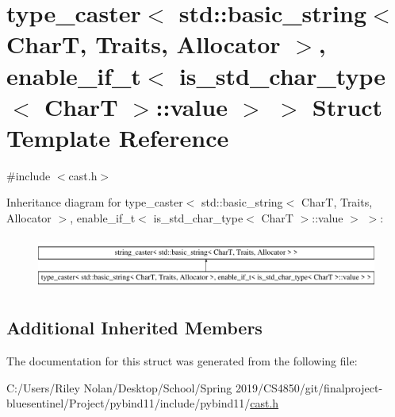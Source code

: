\hypertarget{structtype__caster_3_01std_1_1basic__string_3_01_char_t_00_01_traits_00_01_allocator_01_4_00_01ece498b5200b790571970efc6b6c56da1}{}\section{type\+\_\+caster$<$ std\+::basic\+\_\+string$<$ CharT, Traits, Allocator $>$, enable\+\_\+if\+\_\+t$<$ is\+\_\+std\+\_\+char\+\_\+type$<$ CharT $>$\+::value $>$ $>$ Struct Template Reference}
\label{structtype__caster_3_01std_1_1basic__string_3_01_char_t_00_01_traits_00_01_allocator_01_4_00_01ece498b5200b790571970efc6b6c56da1}


{\ttfamily \#include $<$cast.\+h$>$}

Inheritance diagram for type\+\_\+caster$<$ std\+::basic\+\_\+string$<$ CharT, Traits, Allocator $>$, enable\+\_\+if\+\_\+t$<$ is\+\_\+std\+\_\+char\+\_\+type$<$ CharT $>$\+::value $>$ $>$\+:\begin{figure}[H]
\begin{center}
\leavevmode
\includegraphics[height=1.733746cm]{structtype__caster_3_01std_1_1basic__string_3_01_char_t_00_01_traits_00_01_allocator_01_4_00_01ece498b5200b790571970efc6b6c56da1}
\end{center}
\end{figure}
\subsection*{Additional Inherited Members}


The documentation for this struct was generated from the following file\+:\begin{DoxyCompactItemize}
\item 
C\+:/\+Users/\+Riley Nolan/\+Desktop/\+School/\+Spring 2019/\+C\+S4850/git/finalproject-\/bluesentinel/\+Project/pybind11/include/pybind11/\mbox{\hyperlink{cast_8h}{cast.\+h}}\end{DoxyCompactItemize}
